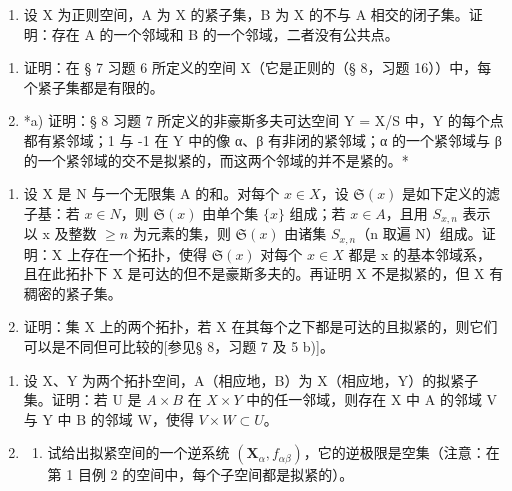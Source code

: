 \begin{enumerate}
\def\labelenumi{\alph{enumi})}
\setcounter{enumi}{1}
\tightlist
\item
  设 X 为正则空间，A 为 X 的紧子集，B 为 X 的不与 A 相交的闭子集。证明：存在 A 的一个邻域和 B 的一个邻域，二者没有公共点。
\end{enumerate}

\begin{enumerate}
\def\labelenumi{\arabic{enumi})}
\setcounter{enumi}{3}
\item
  证明：在 § 7 习题 6 所定义的空间 X（它是正则的（§ 8，习题 16））中，每个紧子集都是有限的。
\item
  *a) 证明：§ 8 习题 7 所定义的非豪斯多夫可达空间 Y = X/S 中，Y 的每个点都有紧邻域；1 与 -1 在 Y 中的像 α、β 有非闭的紧邻域；α 的一个紧邻域与 β 的一个紧邻域的交不是拟紧的，而这两个邻域的并不是紧的。*
\end{enumerate}

\begin{enumerate}
\def\labelenumi{\alph{enumi})}
\setcounter{enumi}{1}
\item
  设 X 是 N 与一个无限集 A 的和。对每个 \(x \in X\)，设 \(\mathfrak{S}(x)\) 是如下定义的滤子基：若 \(x \in N\)，则 \(\mathfrak{S}(x)\) 由单个集 \(\{x\}\) 组成；若 \(x \in A\)，且用 \(S_{x,n}\) 表示以 x 及整数 \(\geqslant n\) 为元素的集，则 \(\mathfrak{S}(x)\) 由诸集 \(S_{x,n}\)（n 取遍 N）组成。证明：X 上存在一个拓扑，使得 \(\mathfrak{S}(x)\) 对每个 \(x \in X\) 都是 x 的基本邻域系，且在此拓扑下 X 是可达的但不是豪斯多夫的。再证明 X 不是拟紧的，但 X 有稠密的紧子集。
\item
  证明：集 X 上的两个拓扑，若 X 在其每个之下都是可达的且拟紧的，则它们可以是不同但可比较的{[}参见§ 8，习题 7 及 5 b){]}。
\end{enumerate}

\begin{enumerate}
\def\labelenumi{\arabic{enumi})}
\setcounter{enumi}{5}
\item
  设 X、Y 为两个拓扑空间，A（相应地，B）为 X（相应地，Y）的拟紧子集。证明：若 U 是 \(A \times B\) 在 \(X \times Y\) 中的任一邻域，则存在 X 中 A 的邻域 V 与 Y 中 B 的邻域 W，使得 \(V \times W \subset U\)。
\item
  \begin{enumerate}
  \def\labelenumii{\alph{enumii})}
  \tightlist
  \item
    试给出拟紧空间的一个逆系统 \((\mathbf{X}_{\alpha}, f_{\alpha\beta})\)，它的逆极限是空集（注意：在第 1 目例 2 的空间中，每个子空间都是拟紧的）。
  \end{enumerate}
\end{enumerate}

